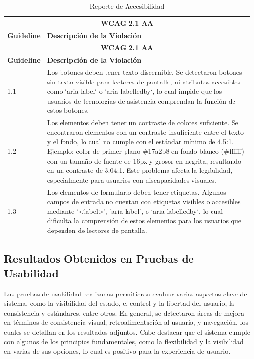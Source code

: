 \documentclass[stu, 12pt, letterpaper, donotrepeattitle, floatsintext, natbib]{apa7}
\begin{document}
\begin{longtable}{|p{3cm}|p{10cm}|}
    \caption{Reporte de Accesibilidad} \label{tab:reporte_accesibilidad} \\
    \hline
    \multicolumn{2}{|c|}{\textbf{WCAG 2.1 AA}} \\ \hline
    \textbf{Guideline} & \textbf{Descripción de la Violación} \\ \hline
    \endfirsthead

    \hline
    \multicolumn{2}{|c|}{\textbf{WCAG 2.1 AA}} \\ \hline
    \textbf{Guideline} & \textbf{Descripción de la Violación} \\ \hline
    \endhead

    1.1 & Los botones deben tener texto discernible. Se detectaron botones sin texto visible para lectores de pantalla, ni atributos accesibles como `aria-label` o `aria-labelledby`, lo cual impide que los usuarios de tecnologías de asistencia comprendan la función de estos botones. \\ \hline
    1.2 & Los elementos deben tener un contraste de colores suficiente. Se encontraron elementos con un contraste insuficiente entre el texto y el fondo, lo cual no cumple con el estándar mínimo de 4.5:1. Ejemplo: color de primer plano \#17a2b8 en fondo blanco (\#ffffff) con un tamaño de fuente de 16px y grosor en negrita, resultando en un contraste de 3.04:1. Este problema afecta la legibilidad, especialmente para usuarios con discapacidades visuales. \\ \hline
    1.3 & Los elementos de formulario deben tener etiquetas. Algunos campos de entrada no cuentan con etiquetas visibles o accesibles mediante `<label>`, `aria-label`, o `aria-labelledby`, lo cual dificulta la comprensión de estos elementos para los usuarios que dependen de lectores de pantalla. \\ \hline
\end{longtable}

\subsection{Resultados Obtenidos en Pruebas de Usabilidad}

\noindent Las pruebas de usabilidad realizadas permitieron evaluar varios aspectos clave del sistema, como la visibilidad del estado, el control y la libertad del usuario, la consistencia y estándares, entre otros. En general, se detectaron áreas de mejora en términos de consistencia visual, retroalimentación al usuario, y navegación, los cuales se detallan en los resultados adjuntos. Cabe destacar que el sistema cumple con algunos de los principios fundamentales, como la flexibilidad y la visibilidad en varias de sus opciones, lo cual es positivo para la experiencia de usuario.
\end{document}
